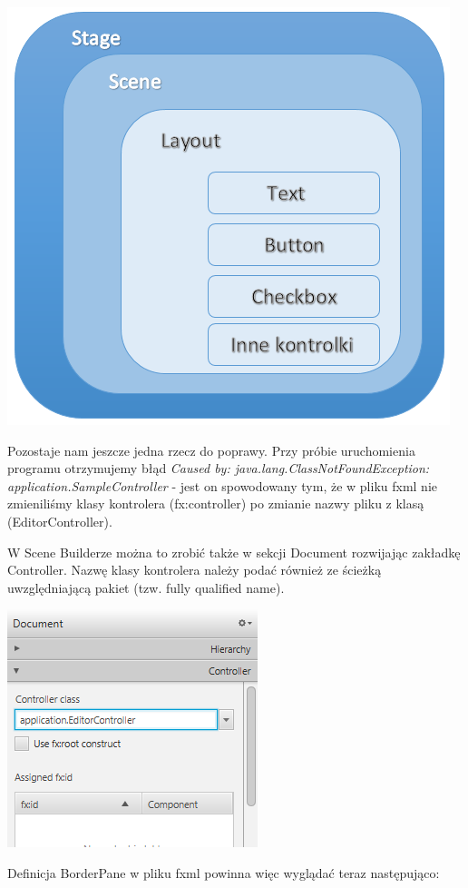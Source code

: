 \documentclass[letterpaper,10pt,english]{sphinxmanual}
\begin{document}
{\hfill\includegraphics{viewh.png}\hfill}

Pozostaje nam jeszcze jedna rzecz do poprawy. Przy próbie uruchomienia programu otrzymujemy błąd \emph{Caused by: java.lang.ClassNotFoundException: application.SampleController} - jest on spowodowany tym, że w pliku fxml nie zmieniliśmy klasy kontrolera (fx:controller) po zmianie nazwy pliku z klasą (EditorController).

W Scene Builderze można to zrobić także w sekcji Document rozwijając zakładkę Controller. Nazwę klasy kontrolera należy podać również ze ścieżką uwzględniającą pakiet (tzw. fully qualified name).

{\hfill\includegraphics{fxcontroller.png}\hfill}

Definicja BorderPane w pliku fxml powinna więc wyglądać teraz następująco:
\end{document}
